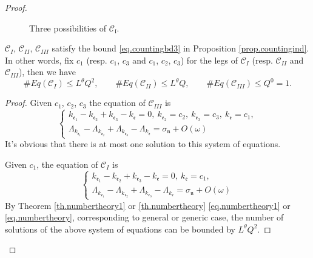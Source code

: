 \begin{proof}
\begin{figure}[H]
{
    }
    \caption{Three possibilities of $\mathcal{C}_\mathfrak{l}$.}
    \label{fig.3possibilities}
\end{figure}
    
    
\begin{lem}\label{lem.countingbdunit}
$\mathcal{C}_{I}$, $\mathcal{C}_{II}$, $\mathcal{C}_{III}$ satisfy the bound \eqref{eq.countingbd3} in Proposition \ref{prop.countingind}. In other words, fix $c_1$ (resp. $c_1$, $c_3$ and $c_1$, $c_2$, $c_3$) for the legs of $\mathcal{C}_{I}$ (resp. $\mathcal{C}_{II}$ and $\mathcal{C}_{III}$), then we have 
\begin{equation}\label{eq.countingbdunit}
    \# Eq(\mathcal{C}_{I})\leq L^\theta Q^{2},\qquad \# Eq(\mathcal{C}_{II})\leq L^\theta Q,\qquad \# Eq(\mathcal{C}_{III})\leq Q^0=1.
\end{equation}
\end{lem}
\begin{proof} Given $c_1$, $c_2$, $c_3$ the equation of $\mathcal{C}_{III}$ is 
    \begin{equation}
        \begin{cases}
        k_{\mathfrak{e}_1}-k_{\mathfrak{e}_2}+k_{\mathfrak{e}_3}-k_{\mathfrak{e}}=0,\ k_{\mathfrak{e}_2}=c_2,\ k_{\mathfrak{e}_3}=c_3,\ k_{\mathfrak{e}}=c_1,
        \\
        \Lambda_{k_{\mathfrak{e}_1}}-\Lambda_{k_{\mathfrak{e}_2}}+\Lambda_{k_{\mathfrak{e}_3}}-\Lambda_{k_{\mathfrak{e}}}=\sigma_{\mathfrak{n}}+O(\omega)
        \end{cases}
    \end{equation}
    It's obvious that there is at most one solution to this system of equations.
    
    Given $c_1$, the equation of $\mathcal{C}_{I}$ is 
    \begin{equation}
        \begin{cases}
        k_{\mathfrak{e}_1}-k_{\mathfrak{e}_2}+k_{\mathfrak{e}_3}-k_{\mathfrak{e}}=0,\ k_{\mathfrak{e}}=c_1,
        \\
        \Lambda_{k_{\mathfrak{e}_1}}-\Lambda_{k_{\mathfrak{e}_2}}+\Lambda_{k_{\mathfrak{e}_3}}-\Lambda_{k_{\mathfrak{e}}}=\sigma_{\mathfrak{n}}+O(\omega)
        \end{cases}
    \end{equation}
    By Theorem \ref{th.numbertheory1} or \ref{th.numbertheory} \eqref{eq.numbertheory1} or \eqref{eq.numbertheory}, corresponding to general or generic case, the number of solutions of the above system of equations can be bounded by $ L^\theta Q^2$.


\end{proof}
\end{proof}
